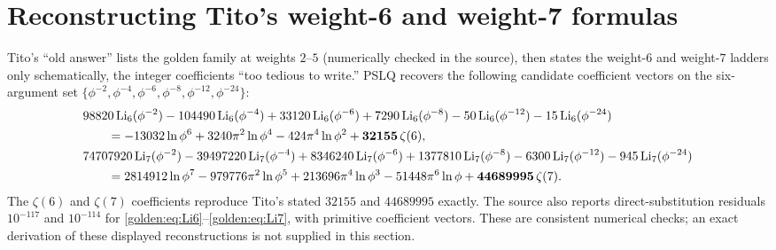 \section{Reconstructing Tito's weight-6 and weight-7 formulas}
Tito's ``old answer'' lists the golden family at weights $2$--$5$
(numerically checked in the source), then states the weight-$6$ and
weight-$7$ ladders only schematically, the integer coefficients ``too
tedious to write.'' PSLQ recovers the following candidate coefficient
vectors on the six-argument set $\{\phi^{-2},\phi^{-4},\phi^{-6},\phi^{-8},\phi^{-12},\phi^{-24}\}$:
{\footnotesize
\begin{align}
\label{golden:eq:Li6}
  &98820\operatorname{Li}_6(\phi^{-2})-104490\operatorname{Li}_6(\phi^{-4})+33120\operatorname{Li}_6(\phi^{-6})+7290\operatorname{Li}_6(\phi^{-8})-50\operatorname{Li}_6(\phi^{-12})-15\operatorname{Li}_6(\phi^{-24})\notag\\
  &\qquad=-13032\ln\phi^6+3240\pi^2\ln\phi^4-424\pi^4\ln\phi^2+\mathbf{32155}\,\zeta(6),\\
\label{golden:eq:Li7}
  &74707920\operatorname{Li}_7(\phi^{-2})-39497220\operatorname{Li}_7(\phi^{-4})+8346240\operatorname{Li}_7(\phi^{-6})+1377810\operatorname{Li}_7(\phi^{-8})-6300\operatorname{Li}_7(\phi^{-12})-945\operatorname{Li}_7(\phi^{-24})\notag\\
  &\qquad=2814912\ln\phi^7-979776\pi^2\ln\phi^5+213696\pi^4\ln\phi^3-51448\pi^6\ln\phi+\mathbf{44689995}\,\zeta(7).
\end{align}}
The $\zeta(6)$ and $\zeta(7)$ coefficients reproduce Tito's stated
$32155$ and $44689995$ exactly. The source also reports direct-substitution
residuals $10^{-117}$ and $10^{-114}$ for
\eqref{golden:eq:Li6}--\eqref{golden:eq:Li7}, with primitive coefficient
vectors. These are consistent numerical checks; an exact derivation of
these displayed reconstructions is not supplied in this section.

